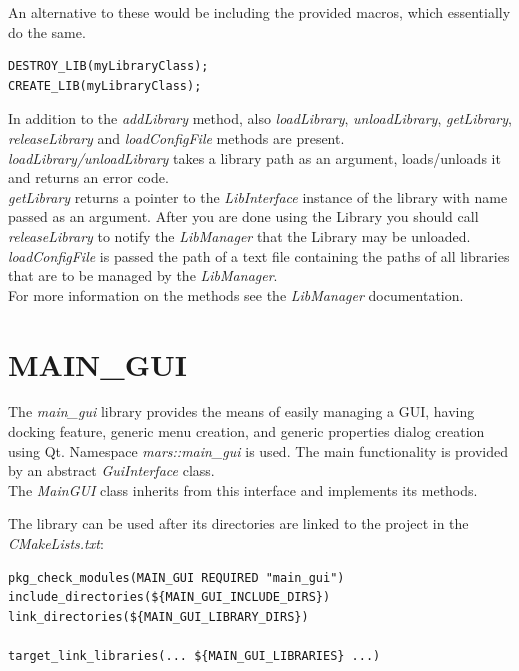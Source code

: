 \documentclass{article}
\begin{document}
An alternative to these would be including the provided macros, which essentially do the same.

\begin{lstlisting}
DESTROY_LIB(myLibraryClass);
CREATE_LIB(myLibraryClass);
\end{lstlisting}

In addition to the \emph{addLibrary} method, also \emph{loadLibrary}, \emph{unloadLibrary}, \emph{getLibrary}, \emph{releaseLibrary} and \emph{loadConfigFile} methods are present.\\

\emph{loadLibrary/unloadLibrary} takes a library path as an argument, loads/unloads it and returns an error code.\\

\emph{getLibrary} returns a pointer to the \emph{LibInterface} instance of the library with name passed as an argument. After you are done using the Library you should call \emph{releaseLibrary} to notify the \emph{LibManager} that the Library may be unloaded.\\

\emph{loadConfigFile} is passed the path of a text file containing the paths of all libraries that are to be managed by the \emph{LibManager}.\\
For more information on the methods see the \emph{LibManager} documentation.


\section{MAIN\_GUI}

The \emph{main\_gui} library provides the means of easily managing a GUI, having docking feature, generic menu creation, and generic properties dialog creation using Qt. Namespace \emph{mars::main\_gui} is used. The main functionality is provided by an abstract \emph{GuiInterface} class.\\

The \emph{MainGUI} class inherits from this interface and implements its methods.

The library can be used after its directories are linked to the project in the \emph{CMakeLists.txt}:

\begin{lstlisting}
pkg_check_modules(MAIN_GUI REQUIRED "main_gui")
include_directories(${MAIN_GUI_INCLUDE_DIRS})
link_directories(${MAIN_GUI_LIBRARY_DIRS})

target_link_libraries(... ${MAIN_GUI_LIBRARIES} ...)
\end{lstlisting}
\end{document}
